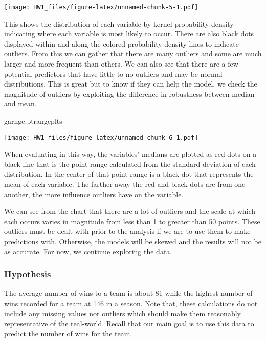 \documentclass[
]{article}
\newenvironment{Shaded}{\begin{snugshade}}{\end{snugshade}}
\newcommand{\NormalTok}[1]{#1}
\begin{document}
\texttt{[image: HW1\_files/figure-latex/unnamed-chunk-5-1.pdf]}

This shows the distribution of each variable by kernel probability
density indicating where each variable is most likely to occur. There
are also black dots displayed within and along the colored probability
density lines to indicate outliers. From this we can gather that there
are many outliers and some are much larger and more frequent than
others. We can also see that there are a few potential predictors that
have little to no outliers and may be normal distributions. This is
great but to know if they can help the model, we check the magnitude of
outliers by exploiting the difference in robustness between median and
mean.

\begin{Shaded}
\begin{Highlighting}[]
\NormalTok{garnge.ptrangeplts }
\end{Highlighting}
\end{Shaded}

\texttt{[image: HW1\_files/figure-latex/unnamed-chunk-6-1.pdf]}

When evaluating in this way, the variables' medians are plotted as red
dots on a black line that is the point range calculated from the
standard deviation of each distribution. In the center of that point
range is a black dot that represents the mean of each variable. The
farther away the red and black dots are from one another, the more
influence outliers have on the variable.

We can see from the chart that there are a lot of outliers and the scale
at which each occurs varies in magnitude from less than 1 to greater
than 50 points. These outliers must be dealt with prior to the analysis
if we are to use them to make predictions with. Otherwise, the models
will be skewed and the results will not be as accurate. For now, we
continue exploring the data.

\hypertarget{hypothesis}{%
\subsubsection{Hypothesis}\label{hypothesis}}

The average number of wins to a team is about 81 while the highest
number of wins recorded for a team at 146 in a season. Note that, these
calculations do not include any missing values nor outliers which should
make them reasonably representative of the real-world. Recall that our
main goal is to use this data to predict the number of wins for the
team.
\end{document}
